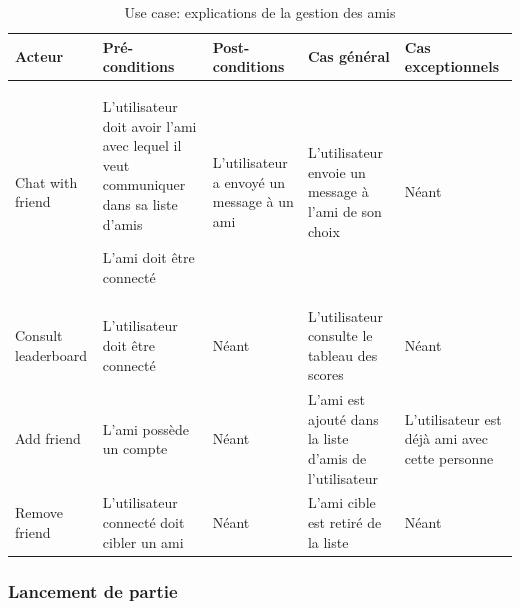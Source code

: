 \documentclass[a4paper,10pt]{article}
\begin{document}
\begin{table}[H]
\begin{tabular}{|p{3.5cm}|p{3cm}|p{3cm}|p{3cm}|p{3cm}|}
\hline
\textbf{Acteur} & \textbf{Pré-conditions} & \textbf{Post-conditions} & \textbf{Cas général}& \textbf{Cas exceptionnels} \\
\hline
Chat with friend& 
L'utilisateur doit avoir l'ami avec lequel il veut communiquer dans sa liste d'amis

L'ami doit être connecté& L'utilisateur a envoyé un message à un ami & L'utilisateur envoie un message à l'ami de son choix & Néant \\
\hline
	Consult leaderboard & L'utilisateur doit être connecté & Néant & L'utilisateur consulte le tableau des scores & Néant \\
\hline
Add friend & L'ami possède un compte& Néant & L'ami est ajouté dans la liste d'amis de l'utilisateur & L'utilisateur est déjà ami avec cette personne\\ \hline
Remove friend& L'utilisateur connecté doit cibler un ami & Néant & L'ami cible est retiré de la liste& Néant\\
\hline
\end{tabular}
	\caption{Use case: explications de la gestion des amis}
\end{table}
\subsubsection{Lancement de partie}
\noindent
\end{document}
